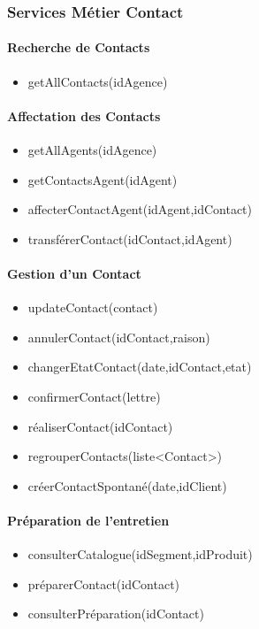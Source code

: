 \subsubsection{Services Métier Contact}

\paragraph{Recherche de Contacts}

\begin{itemize}
\item getAllContacts(idAgence)
\end{itemize}

\paragraph{Affectation des Contacts}

\begin{itemize}
\item getAllAgents(idAgence)
\item getContactsAgent(idAgent)
\item affecterContactAgent(idAgent,idContact)
\item transférerContact(idContact,idAgent)
\end{itemize}

\paragraph{Gestion d'un Contact}

\begin{itemize}
\item updateContact(contact)
\item annulerContact(idContact,raison)
\item changerEtatContact(date,idContact,etat)
\item confirmerContact(lettre)
\item réaliserContact(idContact)
\item regrouperContacts(liste<Contact>)
\item créerContactSpontané(date,idClient)
\end{itemize}

\paragraph{Préparation de l'entretien}

\begin{itemize}
\item consulterCatalogue(idSegment,idProduit)
\item préparerContact(idContact)
\item consulterPréparation(idContact)
\end{itemize}

